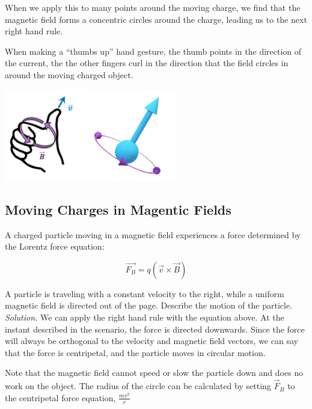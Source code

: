 \documentclass[12pt, titlepage]{article}
\begin{document}
When we apply this to many points around the moving charge, we find that the magnetic field forms a concentric circles around the charge, leading us to the next right hand rule.

When making a ``thumbs up'' hand gesture, the thumb points in the direction of the current, the the other fingers curl in the direction that the field circles in around the moving charged object.
\begin{center}
    \includegraphics[height=4cm]{media/rh2_2.png}
    \includegraphics[height=4cm]{media/rh2.png}
\end{center}

\subsection*{Moving Charges in Magentic Fields}

A charged particle moving in a magnetic field experiences a force determined by the Lorentz force equation:

\begin{equation*}
    \vec{F_B} = q(\vec{v}\times\vec{B})
\end{equation*}
\begin{Problem}
    A particle is traveling with a constant velocity to the right, while a uniform magnetic field is directed out of the page. Describe the motion of the particle.
    \tcblower
    \textit{Solution. } We can apply the right hand rule with the equation above. At the instant described in the scenario, the force is directed downwards. Since the force will always be orthogonal to the velocity and magnetic field vectors, we can say that the force is centripetal, and the particle moves in circular motion.
    
    Note that the magnetic field cannot speed or slow the particle down and does no work on the object. The radius of the circle can be calculated by setting $\vec{F}_B$ to the centripetal force equation, $\frac{mv^2}{r}$
\end{Problem}
\end{document}
